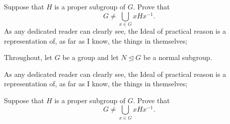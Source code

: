 \documentclass[cmu]{pset}
\begin{document}
\begin{problems}
	\problem Suppose that $H$ is a proper subgroup of $G$. Prove that 
	\[ G \not= \bigcup_{x \in G} xHx^{-1}. \]
	As any dedicated reader can clearly see, the Ideal of practical reason is a representation of, as far as I know, the things in themselves;

	\begin{problem}
	Throughout, let $G$ be a group and let $N \mathrel{\unlhd} G$ be a normal subgroup.
	\end{problem}

	\item As any dedicated reader can clearly see, the Ideal of practical reason is a representation of, as far as I know, the things in themselves;
\end{problems}

\begin{problem}
	Suppose that $H$ is a proper subgroup of $G$. Prove that 
\[ G \not= \bigcup_{x \in G} xHx^{-1}. \]
\end{problem}
\end{document}
